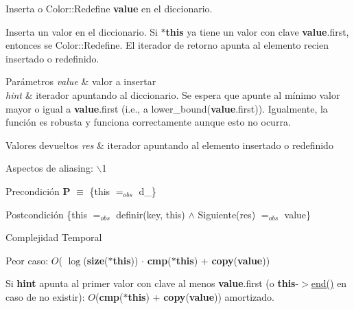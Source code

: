 \-Inserta o \-Color\-::\-Redefine {\bfseries value} en el diccionario. 

\-Inserta un valor en el diccionario. \-Si {\bfseries $\ast$this} ya tiene un valor con clave {\bfseries value}.first, entonces se \-Color\-::\-Redefine. \-El iterador de retorno apunta al elemento recien insertado o redefinido.


\begin{DoxyParams}{\-Parámetros}
{\em value} & valor a insertar \\
\hline
{\em hint} & iterador apuntando al diccionario. \-Se espera que apunte al mínimo valor mayor o igual a {\bfseries value}.first (i.\-e., a lower\-\_\-bound({\bfseries value}.first)). \-Igualmente, la función es robusta y funciona correctamente aunque esto no ocurra. \\
\hline
\end{DoxyParams}

\begin{DoxyRetVals}{\-Valores devueltos}
{\em res} & iterador apuntando al elemento insertado o redefinido\\
\hline
\end{DoxyRetVals}
\begin{DoxyParagraph}{\-Aspectos de aliasing\-:}
$\backslash$1
\end{DoxyParagraph}
\begin{DoxyPrecond}{\-Precondición}
{\bfseries \-P} $\equiv$ \{this $=_{obs}$ d\-\_\} 
\end{DoxyPrecond}
\begin{DoxyPostcond}{\-Postcondición}
\{this $=_{obs}$ definir(key, this) $\land$ \-Siguiente(res) $=_{obs}$ value\}
\end{DoxyPostcond}

\begin{DoxyDescription}
\item[\-Complejidad \-Temporal]
\begin{DoxyItemize}
\item \-Peor caso\-: $O$( $\log$({\bfseries size}({\bfseries $\ast$this})) $\cdot$ {\bfseries cmp}({\bfseries $\ast$this}) $+$ {\bfseries copy}({\bfseries value}))
\item \-Si {\bfseries hint} apunta al primer valor con clave al menos {\bfseries value}.first (o {\bfseries this}-\/$>$\hyperlink{classaed2_1_1map_a76023e6a56cb625513e1b5ea028bf983_a76023e6a56cb625513e1b5ea028bf983}{end()} en caso de no existir)\-: $O$({\bfseries cmp}({\bfseries $\ast$this}) $+$ {\bfseries copy}({\bfseries value})) amortizado. 
\end{DoxyItemize}
\end{DoxyDescription}


